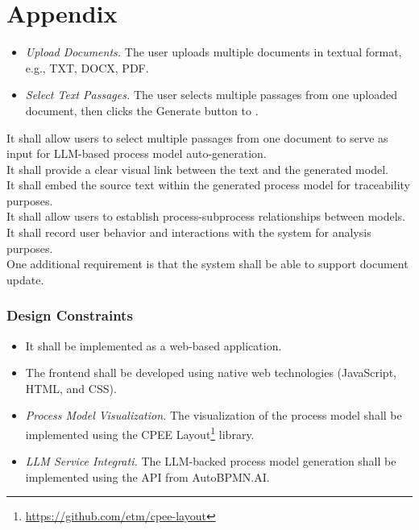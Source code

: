 \chapter{Appendix}


\begin{itemize}
    \item \textit{Upload Documents.} The user uploads multiple documents in textual format, e.g., TXT, DOCX, PDF.
    \item \textit{Select Text Passages.} The user selects multiple passages from one uploaded document, then clicks the Generate button to .
    
\end{itemize}

It shall allow users to select multiple passages from one document to serve as input for LLM-based process model auto-generation. \\
It shall provide a clear visual link between the text and the generated model.\\
It shall embed the source text within the generated process model for traceability purposes.\\
It shall allow users to establish process-subprocess relationships between models.\\
It shall record user behavior and interactions with the system for analysis purposes.\\
One additional requirement is that the system shall be able to support document update.
\subsection{Design Constraints}
\begin{itemize}
    \item It shall be implemented as a web-based application.\\
    \item The frontend shall be developed using native web technologies (JavaScript, HTML, and CSS).\\
    \item \textit{Process Model Visualization.} The visualization of the process model shall be implemented using the CPEE Layout\footnote{\url{https://github.com/etm/cpee-layout}} library.\\
    \item \textit{LLM Service Integrati.} The LLM-backed process model generation shall be implemented using the API from AutoBPMN.AI.\\
\end{itemize}